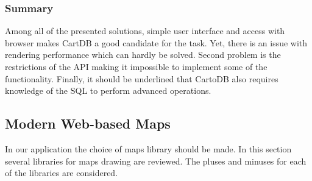 \subsubsection{Summary}

Among all of the presented solutions, simple user interface and access with browser makes CartDB a
good candidate for the task. Yet, there is an issue with rendering performance which can hardly  be
solved. Second problem is the restrictions of the API making it impossible to implement some of the
functionality. Finally, it should be underlined that CartoDB also requires knowledge of the SQL
to perform advanced operations.

\subsection{Modern Web-based Maps}
In our application the choice of maps library should be made. In this section several
libraries for maps drawing are reviewed. The pluses and minuses for each of the
libraries are considered.

